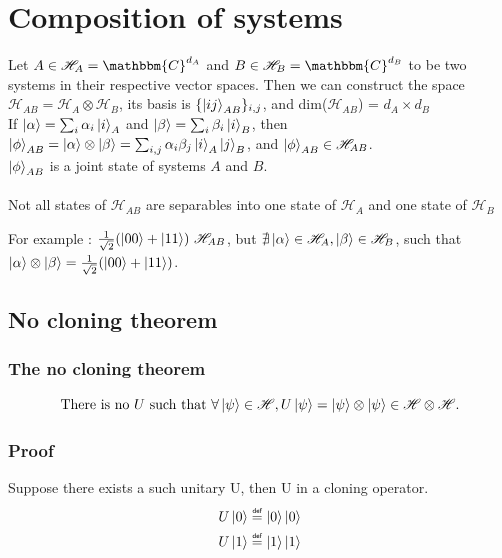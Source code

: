 \documentclass{article}
\newcommand\eqdef{\mathrel{\overset{\makebox[0pt]{\mbox{\normalfont\tiny\sffamily def}}}{=}}}
\begin{document}
\section{Composition of systems}
Let $A \in \mathscr{H}_A = \mathbbm{C}^{d_A}$ and $B \in \mathscr{H}_B = \mathbbm{C}^{d_B}$
to be two systems in their respective vector spaces.
Then we can construct the space $\mathscr{H}_{AB} = \mathscr{H}_A \otimes \mathscr{H}_B$, its basis is
$\{\ket{ij}_{AB}\}_{i, j}$, and dim($\mathscr{H}_{AB}$) = $d_A \times d_B$
\\\noindent
If $\ket{\alpha} = \sum_i\alpha_i\ket{i}_A$ and $\ket{\beta} = \sum_i\beta_i\ket{i}_B$,
then $\ket{\phi}_{AB}=\ket{\alpha} \otimes \ket{\beta} = \sum_{i,j}\alpha_i\beta_j\ket{i}_A\ket{j}_B$,
and $\ket{\phi}_{AB} \in \mathscr{H}_{AB}$.
\\\noindent
$\ket{\phi}_{AB}$ is a joint state of systems $A$ and $B$.
\\ \\\noindent
Not all states of $\mathscr{H}_{AB}$ are separables into one state of $\mathscr{H}_{A}$ and one state of $\mathscr{H}_{B}$

For example : $\frac{1}{\sqrt{2}}(\ket{00} + \ket{11}) \ \mathscr{H}_{AB}$, but
$\nexists \ket{\alpha}\in \mathscr{H}_A, \ket{\beta}\in \mathscr{H}_B$, such that \\\noindent
$\ket{\alpha}\otimes\ket{\beta} = \frac{1}{\sqrt{2}}(\ket{00} + \ket{11})$.

\subsection{No cloning theorem}
\subsubsection*{The no cloning theorem}
\begin{equation}
    \text{There is no } U \text{ such that } \forall \ket{\psi} \in \mathscr{H}, U\ket{\psi} = \ket{\psi} \otimes \ket{\psi}
    \in \mathscr{H} \otimes \mathscr{H}.
\end{equation}
\subsubsection*{Proof}
Suppose there exists a such unitary U, then U in a cloning operator.
\begin{equation}
    \begin{aligned}
        U\ket{0} \eqdef \ket{0}\ket{0} \\
        U\ket{1} \eqdef \ket{1}\ket{1}
    \end{aligned}
\end{equation}
\end{document}
